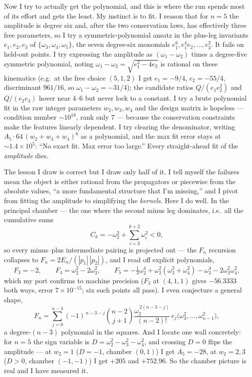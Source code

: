 \documentclass{article}
\begin{document}
Now I try to actually get the polynomial, and this is where the run spends most of
its effort and gets the least. My instinct is to fit. I reason that for $n=5$ the
amplitude is degree six and, after the two conservation laws, has effectively three
free parameters, so I try a symmetric-polynomial ansatz in the plus-leg invariants
$e_1,e_2,e_3$ of $\{\omega_3,\omega_4,\omega_5\}$, the seven degree-six monomials
$e_1^6,e_1^4e_2,\dots,e_3^2$. It fails on held-out points. I try expressing the
amplitude as $(\omega_1-\omega_2)$ times a degree-five symmetric polynomial, noting
$\omega_1-\omega_2=\sqrt{e_1^2-4e_2}$ is rational on these kinematics (e.g.\ at the
free choice $(5,1,2)$ I get $e_1=-9/4$, $e_2=-55/4$, discriminant $961/16$, so
$\omega_1-\omega_2=-31/4$); the candidate ratios $Q/(e_1e_2^2)$ and $Q/(e_2e_3)$
hover near $4$--$6$ but never lock to a constant. I try a brute polynomial fit in
the raw integer parameters $w_2,w_3,w_4$ and the design matrix is hopeless ---
condition number $\sim10^{18}$, rank only $7$ --- because the conservation
constraints make the features linearly dependent. I try clearing the denominator,
writing $A_5\cdot 64\,(w_2{+}w_3{+}w_4)^6$ as a polynomial, and the max fit error
stays at $\sim 1.4\times10^5$: ``No exact fit. Max error too large.'' Every
straight-ahead fit of the \emph{amplitude} dies.

The lesson I draw is correct but I draw only half of it. I tell myself the failures
mean the object is either rational from the propagators or piecewise from the
absolute values, ``a more fundamental structure that I'm missing,'' and I pivot
from fitting the amplitude to simplifying the \emph{kernels}. Here I do well. In the
principal chamber --- the one where the second minus leg dominates, i.e.\ all the
cumulative sums
\[
C_k=-\omega_2^2+\sum_{i=3}^{k+2}\omega_i^2<0,
\]
so every minus--plus intermediate pairing is projected out --- the $F_n$ recursion
collapses to $F_n=2E_n/(|p_1|\,|p_2|)$, and I read off explicit polynomials,
\[
F_3=-2,\qquad F_4=\omega_2^2-2\omega_3^2,\qquad
F_5=-\tfrac13\omega_2^4+\omega_2^2(\omega_3^2+\omega_4^2)-\omega_3^4-2\omega_3^2\omega_4^2,
\]
which my port confirms to machine precision ($F_5$ at $(4,1,1)$ gives
$-56.3333$ both ways, error $7\times10^{-15}$; six such points all pass). I even
conjecture a general shape,
\[
F_n=\sum_{j=0}^{n-3}(-1)^{\,n-3-j}\binom{n-2}{j+1}
\frac{\omega_2^{\,2(n-3-j)}}{(n-2)!}\,e_j\!\big(\omega_3^2,\dots,\omega_{n-1}^2\big),
\]
a degree-$(n-3)$ polynomial in the squares. And I locate one wall concretely: for
$n=5$ the sign variable is $D=\omega_2^2-\omega_3^2-\omega_4^2$, and crossing $D=0$
flips the amplitude --- at $w_2=1$ ($D=-1$, chamber $(0,1)$) I get $A_5=-28$, at
$w_2=2,3$ ($D>0$, chamber $(-1,-1)$) I get $+205$ and $+752.96$. So the chamber
picture is real and I have measured it.
\end{document}
